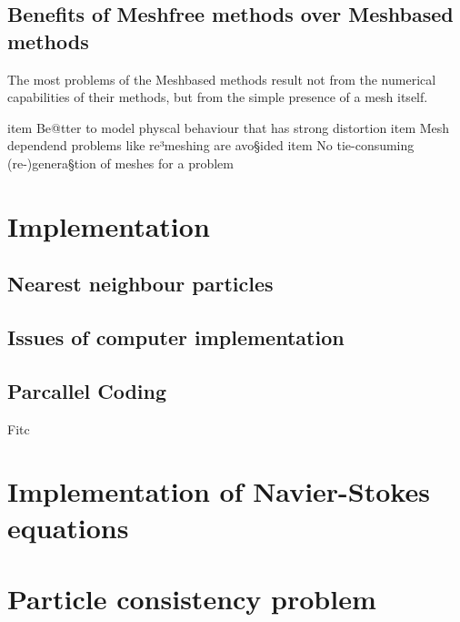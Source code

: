 \subsection{Benefits of Meshfree methods over Meshbased methods}
The most problems of the Meshbased methods result not from the numerical capabilities of their methods, but from the simple presence of a mesh itself. 

item Be@tter to model physcal behaviour that has strong distortion
item Mesh dependend problems like re³meshing are avo§ided
item No tie-consuming (re-)genera§tion of meshes for a problem 

\section{Implementation}

\subsection{Nearest neighbour particles}

\subsection{Issues of computer implementation}

\subsection{Parcallel Coding}


Fitc


\section{Implementation of Navier-Stokes equations}


\section{Particle consistency problem}
